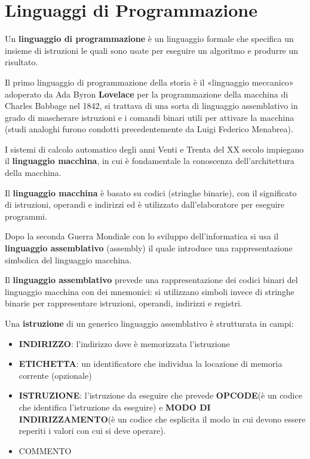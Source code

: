 \documentclass[12pt]{article}
\begin{document}
\section{Linguaggi di Programmazione}
Un \textbf{linguaggio di programmazione} è un linguaggio formale che specifica un insieme di istruzioni le quali sono usate per eseguire un algoritmo e produrre un risultato.\par\medskip\noindent
Il primo linguaggio di programmazione della storia è il «linguaggio meccanico» adoperato da Ada Byron \textbf{Lovelace} per la programmazione della macchina di Charles Babbage nel 1842, si trattava di una sorta di linguaggio assemblativo in grado di mascherare istruzioni e i comandi binari utili per attivare la macchina (studi analoghi furono condotti precedentemente da Luigi Federico Menabrea).\par\medskip\noindent
I sistemi di calcolo automatico degli anni Venti e Trenta del XX secolo impiegano il \textbf{linguaggio macchina}, in cui è fondamentale la conoscenza dell'architettura della macchina.\par\medskip\noindent 
Il \textbf{linguaggio macchina} è basato su codici (stringhe binarie), con il significato di istruzioni, operandi e indirizzi ed è utilizzato dall’elaboratore per eseguire programmi.\par\medskip\noindent
Dopo la seconda Guerra Mondiale con lo sviluppo dell'informatica si usa il \textbf{linguaggio assemblativo} (assembly) il quale introduce una rappresentazione simbolica del linguaggio macchina.\par\medskip\noindent
Il \textbf{linguaggio assemblativo} prevede una rappresentazione dei codici binari del linguaggio macchina con dei mnemonici: si utilizzano simboli invece di stringhe binarie per rappresentare istruzioni, operandi, indirizzi e registri.\par\medskip\noindent
\newpage
Una \textbf{istruzione} di un generico linguaggio assemblativo è strutturata in campi:
\begin{itemize}
\item \textbf{INDIRIZZO}: l’indirizzo dove è memorizzata l’istruzione
\item \textbf{ETICHETTA}: un identificatore che individua la locazione di memoria corrente (opzionale)
\item \textbf{ISTRUZIONE}: l’istruzione da eseguire che prevede \textbf{OPCODE}(è un codice che identifica l’istruzione da eseguire) e  \textbf{MODO DI INDIRIZZAMENTO}(è un codice che esplicita il modo in cui devono essere reperiti i valori con cui si deve operare).
\item COMMENTO
\end{itemize}
\end{document}
